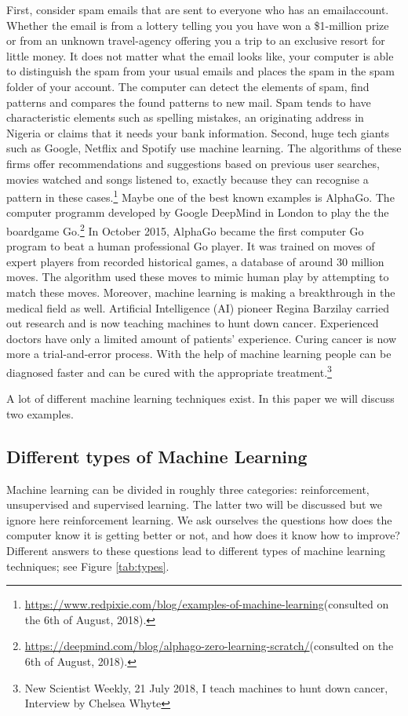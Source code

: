 \documentclass[11pt]{article}
\begin{document}
First, consider spam emails that are sent to everyone who has an emailaccount. Whether the email is from a lottery telling you you have won a \$1-million prize or from an unknown travel-agency offering you a trip to an exclusive resort for little money. It does not matter what the email looks like, your computer is able to distinguish the spam from your usual emails and places the spam in the spam folder of your account. The computer can detect the elements of spam, find patterns and compares the found patterns to new mail. Spam tends to have characteristic elements such as spelling mistakes, an originating address in Nigeria or claims that it needs your bank information. Second, huge tech giants such as Google, Netflix and Spotify use machine learning. The algorithms of these firms offer recommendations and suggestions based on previous user searches, movies watched and songs listened to, exactly because they can recognise a pattern in these cases.\footnote{\url{https://www.redpixie.com/blog/examples-of-machine-learning}(consulted on the 6th of August, 2018).} Maybe one of the best known examples is AlphaGo. The computer programm developed by Google DeepMind in London to play the the boardgame Go.\footnote{\url{https://deepmind.com/blog/alphago-zero-learning-scratch/}(consulted on the 6th of August, 2018).} In October 2015, AlphaGo became the first computer Go program to beat a human professional Go player. It was trained on moves of expert players from recorded historical games, a database of around 30 million moves. The algorithm used these moves to mimic human play by attempting to match these moves. Moreover, machine learning is making a breakthrough in the medical field as well. Artificial Intelligence (AI) pioneer Regina Barzilay carried out research and is now teaching machines to hunt down cancer. Experienced doctors have only a limited amount of patients' experience. Curing cancer is now more a trial-and-error process. With the help of machine learning people can be diagnosed faster and can be cured with the appropriate treatment.\footnote{New Scientist Weekly, 21 July 2018, I teach machines to hunt down cancer, Interview by Chelsea Whyte}   

A lot of different machine learning techniques exist. In this paper we will discuss two examples.


\subsection{Different types of Machine Learning}
\label{sec:orgd6781af}
Machine learning can be divided in roughly three categories: reinforcement, unsupervised and supervised learning. The latter two will be discussed but we ignore here reinforcement learning. We ask ourselves the questions how does the computer know it is getting better or not, and how does it know how to improve? Different answers to these questions lead to different types of machine learning techniques; see Figure \ref{tab:types}. 
\end{document}
